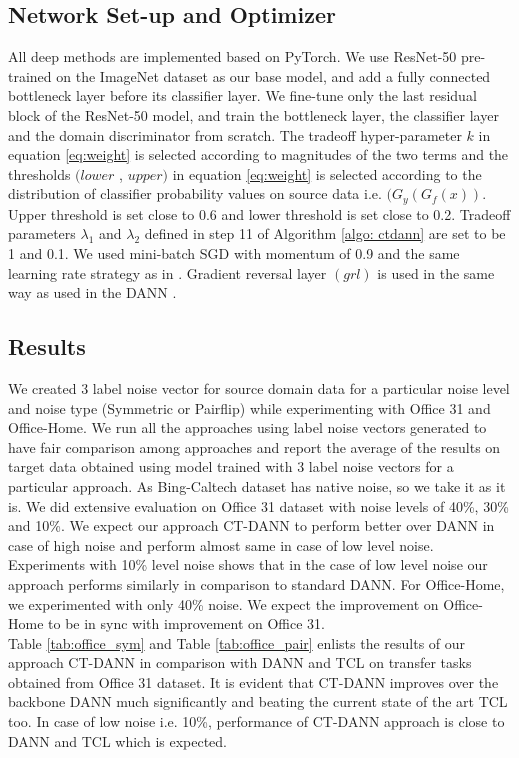\subsection{Network Set-up and Optimizer}
All deep methods are implemented based on PyTorch. We use ResNet-50 pre-trained on the ImageNet dataset \cite{imagenet} as our base model, and add a fully connected bottleneck layer before its classifier layer. We fine-tune only the last residual block of the ResNet-50 model, and train the bottleneck layer, the classifier layer and the domain discriminator from scratch. The tradeoff hyper-parameter $k$ in equation \ref{eq:weight} is selected according to magnitudes of the two terms and the thresholds $(lower$ , $upper)$ in equation \ref{eq:weight} is selected according to the distribution of classifier probability values on source data i.e. $(G_{y}(G_{f}(x))$. Upper threshold is set close to 0.6 and lower threshold is set close to 0.2. Tradeoff parameters $\lambda_1$ and $\lambda_2$ defined in step 11 of Algorithm \ref{algo: ctdann} are set to be 1 and 0.1. We used mini-batch SGD with momentum of 0.9 and the same learning rate strategy as in \cite{dann}. Gradient reversal layer $(grl)$ is used in the same way as used in the DANN \cite{dann}.
\subsection{Results}
We created 3 label noise vector for source domain data for a particular noise level and noise type (Symmetric or Pairflip) while experimenting with Office 31 and Office-Home. We run all the approaches using label noise vectors generated to have fair comparison among approaches and report the average of the results on target data obtained using model trained with 3 label noise vectors for a particular approach. As Bing-Caltech dataset has native noise, so we take it as it is. We did extensive evaluation on Office 31 dataset with noise levels of 40\%, 30\% and 10\%. We expect our approach CT-DANN to perform better over DANN in case of high noise and perform almost same in case of low level noise. Experiments with 10\% level noise shows that in the case of low level noise our approach performs similarly in comparison to standard DANN. For Office-Home, we experimented with only 40\% noise. We expect the improvement on Office-Home to be in sync with improvement on Office 31.\\
Table \ref{tab:office_sym} and Table \ref{tab:office_pair} enlists the results of our approach CT-DANN in comparison with DANN and TCL on transfer tasks obtained from Office 31 dataset. It is evident that CT-DANN improves over the backbone DANN much significantly and beating the current state of the art TCL too. In case of low noise i.e. 10\%, performance of CT-DANN approach is close to DANN and TCL which is expected. 

